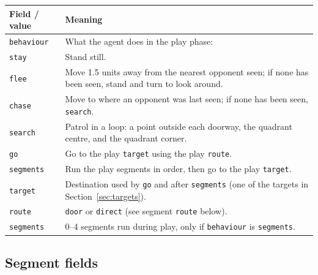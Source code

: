 \documentclass[11pt]{article}
\begin{document}
\begin{tabularx}{\linewidth}{@{}l Y@{}}
  \toprule
  Field / value & Meaning \\
  \midrule
  \texttt{behaviour} & What the agent does in the play phase: \\
  \quad\texttt{stay}     & Stand still. \\
  \quad\texttt{flee}     & Move 1.5 units away from the nearest opponent seen; if none has been seen,
                           stand and turn to look around. \\
  \quad\texttt{chase}    & Move to where an opponent was last seen; if none has been seen, \texttt{search}. \\
  \quad\texttt{search}   & Patrol in a loop: a point outside each doorway, the quadrant centre, and the
                           quadrant corner. \\
  \quad\texttt{go}       & Go to the play \texttt{target} using the play \texttt{route}. \\
  \quad\texttt{segments} & Run the play segments in order, then go to the play \texttt{target}. \\
  \texttt{target}    & Destination used by \texttt{go} and after \texttt{segments} (one of the targets in
                       Section~\ref{sec:targets}). \\
  \texttt{route}     & \texttt{door} or \texttt{direct} (see segment \texttt{route} below). \\
  \texttt{segments}  & 0--4 segments run during play, only if \texttt{behaviour} is \texttt{segments}. \\
  \bottomrule
\end{tabularx}

\subsection{Segment fields}
\end{document}

